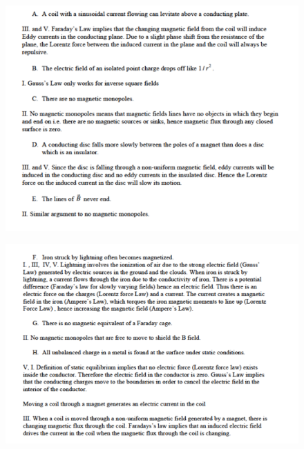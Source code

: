 \documentclass[makesolutionspdf]{esg8022pset}
\begin{document}

\begin{solution}
  \begin{figure}[H]
    \centering
    \includegraphics[width = 15cm]{max_gen_sola}
  \end{figure}
  \begin{figure}[H]
    \centering
    \includegraphics[width = 15cm]{max_gen_solb}
  \end{figure}
  \begin{figure}[H]

\end{figure}
\end{solution}
\end{document}
